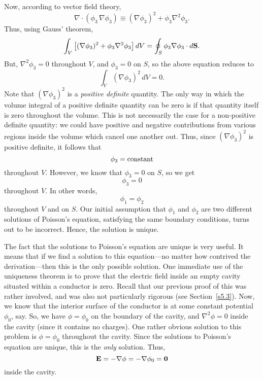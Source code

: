Now, according to vector field theory,
\begin{equation}
\nabla\cdot(\phi_3\,\nabla\phi_3) \equiv (\nabla \phi_3)^2  +\phi_3\nabla^2\phi_3.
\end{equation}
Thus, using Gauss' theorem,
\begin{equation}
\int_V \left[ (\nabla\phi_3)^2 +\phi_3 \nabla^2\phi_3\right] dV = 
\oint_S \phi_3 \nabla \phi_3\cdot d{\bf S}. 
\end{equation}
But, $\nabla^2\phi_3 = 0$ throughout $V$, and $\phi_3=0$ on $S$, so the
above equation reduces
to
\begin{equation}
\int_V (\nabla \phi_3)^2\,dV = 0.
\end{equation}
Note that $(\nabla \phi_3)^2$ is a {\em positive definite} quantity. The only way in
which the volume integral of a positive definite quantity can be zero is if
that quantity itself is zero throughout the volume. This is not necessarily the
case for a non-positive definite quantity: we could have positive and negative
contributions from various regions inside the volume which cancel one another out.
Thus, since $(\nabla \phi_3)^2$ is positive definite, it follows that 
\begin{equation}
\phi_3 = {\rm constant}
\end{equation}
throughout $V$. However, we know that $\phi_3 =0 $ on $S$, so we get
\begin{equation}
\phi_3 = 0
\end{equation}
throughout $V$. In other words,
\begin{equation}
\phi_1 = \phi_2
\end{equation}
throughout $V$ and on $S$. Our initial assumption that $\phi_1$ and $\phi_2$
are two different solutions of Poisson's equation, satisfying the same
boundary conditions, turns out to be incorrect. Hence, the solution is unique.

The fact that the solutions to Poisson's equation are unique is very useful.
It means that if we find a solution to this equation---no matter how contrived
the derivation---then this is the only possible solution. One immediate use of the
uniqueness theorem is to prove that the electric field inside an empty cavity
situated within a conductor is zero. Recall that our previous proof of this was rather involved,
and was  also not particularly rigorous (see Section~\ref{s5.3}). 
Now, we know that the interior surface of the conductor is at some constant potential
$\phi_0$, say. So, we have $\phi=\phi_0$ on the boundary of the cavity, and 
$\nabla^2 \phi
 =0 $ inside the cavity (since it contains no charges). One rather obvious
solution to this problem is $\phi = \phi_0$ throughout the cavity. Since the
solutions to Poisson's equation are unique, this is the {\em only}\/ solution.
Thus,
\begin{equation}
{\bf E} = - \nabla\phi = -\nabla \phi_0 = {\bf 0}
\end{equation}
inside the cavity.


